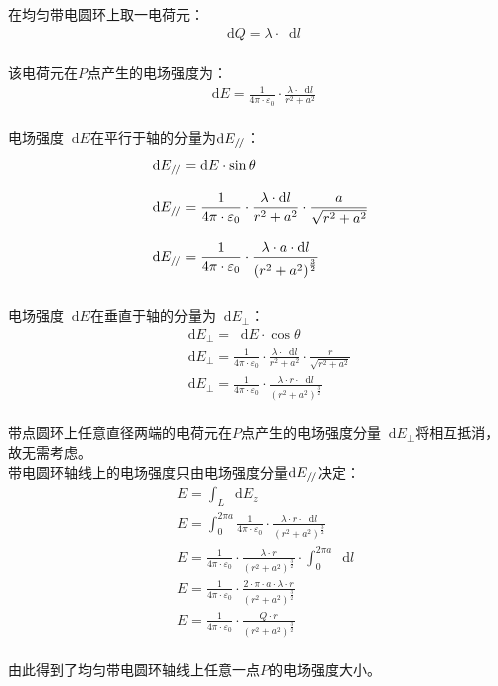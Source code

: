 \documentclass[UTF8]{ctexart}
\newcommand*{\dif}{\mathop{}\!\mathrm{d}}
\renewcommand\parallel{{\mathrel{/\mskip-2.5mu/}}}
\begin{document}
\newpage

    在均匀带电圆环上取一电荷元：
    \begin{align}
        \dif Q=\lambda\cdot\dif l
    \end{align}\\
    该电荷元在$P$点产生的电场强度为：
    \begin{align}
        \dif E=\frac{1}{4\pi\cdot\varepsilon_0}\cdot\frac{\lambda\cdot\dif l}{r^2+a^2}
    \end{align}\\
    电场强度$\dif E$在平行于轴的分量为$\dif E_\parallel$：
    \begin{align}
        &\dif E_\parallel=\dif E\cdot\sin\theta\\[3mm]
        &\dif E_\parallel=\frac{1}{4\pi\cdot\varepsilon_0}\cdot\frac{\lambda\cdot\dif l}{r^2+a^2}\cdot\frac{a}{\sqrt{r^2+a^2}}\\[3mm]
        &\dif E_\parallel=\frac{1}{4\pi\cdot\varepsilon_0}\cdot\frac{\lambda\cdot a\cdot\dif l}{\left(r^2+a^2\right)^{\frac{3}{2}}}
    \end{align}\\
    电场强度$\dif E$在垂直于轴的分量为$\dif E_\perp$：
    \begin{align}
        &\dif E_\perp=\dif E\cdot\cos\theta\\[3mm]
        &\dif E_\perp=\frac{1}{4\pi\cdot\varepsilon_0}\cdot\frac{\lambda\cdot\dif l}{r^2+a^2}\cdot\frac{r}{\sqrt{r^2+a^2}}\\[3mm]
        &\dif E_\perp=\frac{1}{4\pi\cdot\varepsilon_0}\cdot\frac{\lambda\cdot r\cdot\dif l}{\left(r^2+a^2\right)^{\frac{3}{2}}}
    \end{align}\\
    带点圆环上任意直径两端的电荷元在$P$点产生的电场强度分量$\dif E_\perp$将相互抵消，故无需考虑。\\[3mm]
    带电圆环轴线上的电场强度只由电场强度分量$\dif E_\parallel$决定：\vspace{5pt}
    \begin{align}
        &E=\int_L \dif E_z\\[3mm]
        &E=\int_0^{2\pi a} \frac{1}{4\pi\cdot\varepsilon_0}\cdot\frac{\lambda\cdot r\cdot\dif l}{\left(r^2+a^2\right)^{\frac{3}{2}}}\\[3mm]
        &E=\frac{1}{4\pi\cdot\varepsilon_0}\cdot\frac{\lambda\cdot r}{\left(r^2+a^2\right)^{\frac{3}{2}}}\cdot\int_0^{2\pi a}\dif l\\[3mm]
        &E=\frac{1}{4\pi\cdot\varepsilon_0}\cdot\frac{2\cdot\pi\cdot a\cdot\lambda\cdot r}{\left(r^2+a^2\right)^{\frac{3}{2}}}\\[3mm]
        &E=\frac{1}{4\pi\cdot\varepsilon_0}\cdot\frac{Q\cdot r}{\left(r^2+a^2\right)^{\frac{3}{2}}}
    \end{align}\\
    由此得到了均匀带电圆环轴线上任意一点$P$的电场强度大小。
\end{document}
